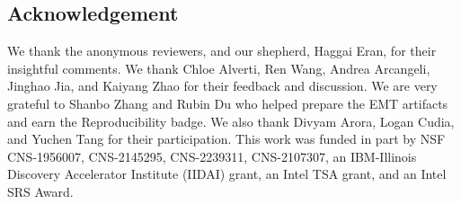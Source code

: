 \vspace{-3.5pt}
\subsection*{Acknowledgement}

\noindent
We thank the anonymous reviewers, and our shepherd, 
    Haggai Eran, for their insightful comments.
We thank Chloe Alverti, Ren Wang, 
    Andrea Arcangeli, Jinghao Jia, and Kaiyang Zhao for their feedback and discussion.
We are very grateful to Shanbo Zhang and Rubin Du who helped prepare the EMT artifacts
    and earn the Reproducibility badge.
We also thank Divyam Arora, Logan Cudia, 
    and Yuchen Tang
    for their participation.
This work was funded in part by NSF CNS-1956007,
    CNS-2145295, CNS-2239311, CNS-2107307,
    an IBM-Illinois Discovery Accelerator
Institute (IIDAI) grant, 
    an Intel TSA grant, and an Intel SRS Award.

